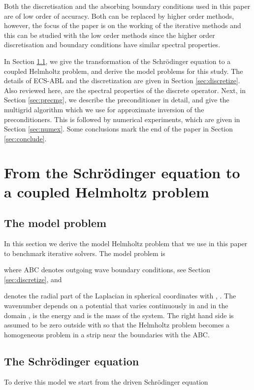 \documentclass[mathpazo]{cicp}
\theoremstyle{definition}
\numberwithin{equation}{section}
\providecommand{\wv}{}
\providecommand{\hbz}{}
\begin{document}
\wv{Both the discretisation and the absorbing boundary conditions used
  in this paper are of low order of accuracy. Both can be replaced by
  higher order methods, however, the focus of the paper is on the
  working of the iterative methods and this can be studied with the
  low order methods since the higher order discretisation and
  boundary conditions have similar spectral properties.}

In Section \ref{sec:derive}, we give the transformation of the
Schr\"odinger equation to a coupled Helmholtz problem, and derive the
model problems for this study. The details of ECS-ABL and \hbz{the discretization} are given in Section \ref{sec:discretize}. Also reviewed
here, are the spectral properties of the discrete operator. Next, in
Section \ref{sec:precmg}, we describe the  preconditioner in detail,
and give the multigrid algorithm which we use for approximate
inversion of the preconditioners. This is followed by numerical
experiments, which are given in Section \ref{sec:numex}. Some
conclusions mark the end of the paper in Section \ref{sec:conclude}.
 
\section{From the Schr\"odinger equation to a coupled Helmholtz problem}
\subsection{The model problem}
\label{sec:derive}
In this section we derive the model Helmholtz problem that we use in
this paper to benchmark iterative solvers.  The model problem is \wv{

where  ABC denotes outgoing wave boundary conditions, see Section \ref{sec:discretize}, and 
}

\wv{ 
denotes the radial part of the Laplacian in spherical coordinates with , .
The wavenumber  depends on a potential
 that} \hbz{varies continuously in} \wv{ and }
\hbz{in the domain }\wv{ ,   is the energy and  is the mass of the system.  The right hand side  is assumed
to be zero outside  with  so that the Helmholtz problem becomes a
 homogeneous problem  in a strip near the boundaries with the ABC.}
\subsection{The Schr\"odinger equation}
To derive this model we start from the driven Schr\"odinger equation
\end{document}
